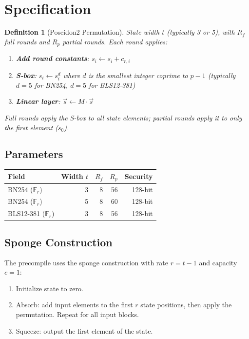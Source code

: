 \documentclass[11pt,a4paper]{article}
\newtheorem{definition}{Definition}
\begin{document}
\section{Specification}

\begin{definition}[Poseidon2 Permutation]
State width $t$ (typically 3 or 5), with $R_f$ full rounds and $R_p$ partial rounds.
Each round applies:
\begin{enumerate}
  \item \textbf{Add round constants}: $s_i \gets s_i + c_{r,i}$
  \item \textbf{S-box}: $s_i \gets s_i^d$ where $d$ is the smallest integer
    coprime to $p-1$ (typically $d = 5$ for BN254, $d = 5$ for BLS12-381)
  \item \textbf{Linear layer}: $\vec{s} \gets M \cdot \vec{s}$
\end{enumerate}
Full rounds apply the S-box to all state elements; partial rounds apply it to
only the first element ($s_0$).
\end{definition}

\subsection{Parameters}

\begin{table}[H]
\centering
\begin{tabular}{lrrrr}
\toprule
\textbf{Field} & \textbf{Width $t$} & \textbf{$R_f$} & \textbf{$R_p$} & \textbf{Security} \\
\midrule
BN254 ($\mathbb{F}_r$) & 3 & 8 & 56 & 128-bit \\
BN254 ($\mathbb{F}_r$) & 5 & 8 & 60 & 128-bit \\
BLS12-381 ($\mathbb{F}_r$) & 3 & 8 & 56 & 128-bit \\
\bottomrule
\end{tabular}
\end{table}

\subsection{Sponge Construction}

The precompile uses the sponge construction with rate $r = t - 1$ and capacity
$c = 1$:
\begin{enumerate}
  \item Initialize state to zero.
  \item Absorb: add input elements to the first $r$ state positions, then
    apply the permutation. Repeat for all input blocks.
  \item Squeeze: output the first element of the state.
\end{enumerate}
\end{document}
